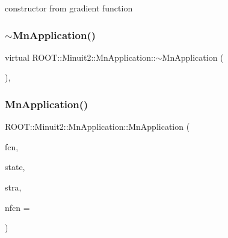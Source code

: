 constructor from gradient function 

\mbox{\label{classROOT_1_1Minuit2_1_1MnApplication_ab8f38ab869bbfe082a2dbcefe1fb19de}} 
\subsubsection{\texorpdfstring{$\sim$MnApplication()}{~MnApplication()}\hspace{0.1cm}{\footnotesize\ttfamily [1/2]}}
{\footnotesize\ttfamily virtual R\+O\+O\+T\+::\+Minuit2\+::\+Mn\+Application\+::$\sim$\+Mn\+Application (\begin{DoxyParamCaption}{ }\end{DoxyParamCaption})\hspace{0.3cm}{\ttfamily [inline]}, {\ttfamily [virtual]}}

\mbox{\label{classROOT_1_1Minuit2_1_1MnApplication_ac3bea3d025068f8bc7d8a6701f23aa81}} 
\subsubsection{\texorpdfstring{MnApplication()}{MnApplication()}\hspace{0.1cm}{\footnotesize\ttfamily [3/4]}}
{\footnotesize\ttfamily R\+O\+O\+T\+::\+Minuit2\+::\+Mn\+Application\+::\+Mn\+Application (\begin{DoxyParamCaption}\item[{const \mbox{\hyperlink{classROOT_1_1Minuit2_1_1FCNBase}{F\+C\+N\+Base}} \&}]{fcn,  }\item[{const \mbox{\hyperlink{classROOT_1_1Minuit2_1_1MnUserParameterState}{Mn\+User\+Parameter\+State}} \&}]{state,  }\item[{const \mbox{\hyperlink{classROOT_1_1Minuit2_1_1MnStrategy}{Mn\+Strategy}} \&}]{stra,  }\item[{unsigned int}]{nfcn = {} }\end{DoxyParamCaption})}



